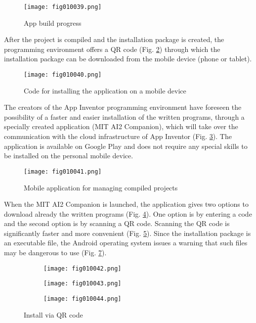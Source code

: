 \begin{figure}[H]
   \centering
   \texttt{[image: fig010039.png]}
   \caption{App build progress}
\label{fig010039}
\end{figure}

After the project is compiled and the installation package is created, the programming environment offers a QR code (Fig. \ref{fig010040}) through which the installation package can be downloaded from the mobile device (phone or tablet).

\begin{figure}[H]
   \centering
   \texttt{[image: fig010040.png]}
   \caption{Code for installing the application on a mobile device}
\label{fig010040}
\end{figure}

The creators of the App Inventor programming environment have foreseen the possibility of a faster and easier installation of the written programs, through a specially created application (MIT AI2 Companion), which will take over the communication with the cloud infrastructure of App Inventor (Fig. \ref{fig010041}). The application is available on Google Play and does not require any special skills to be installed on the personal mobile device.

\begin{figure}[H]
   \centering
   \texttt{[image: fig010041.png]}
   \caption{Mobile application for managing compiled projects}
\label{fig010041}
\end{figure}

When the MIT AI2 Companion is launched, the application gives two options to download already the written programs (Fig. \ref{fig010042}). One option is by entering a code and the second option is by scanning a QR code. Scanning the QR code is significantly faster and more convenient (Fig. \ref{fig010043}). Since the installation package is an executable file, the Android operating system issues a warning that such files may be dangerous to use (Fig. \ref{fig010044}).

\begin{figure}[H]
   \begin{subfigure}{0.31\textwidth}
   \texttt{[image: fig010042.png]}
   \label{fig010042}
   \end{subfigure}
   \begin{subfigure}{0.31\textwidth}
   \texttt{[image: fig010043.png]}
   \label{fig010043}
   \end{subfigure}
   \begin{subfigure}{0.31\textwidth}
   \texttt{[image: fig010044.png]}
   \label{fig010044}
   \end{subfigure}
   \caption{Install via QR code}
\end{figure}

